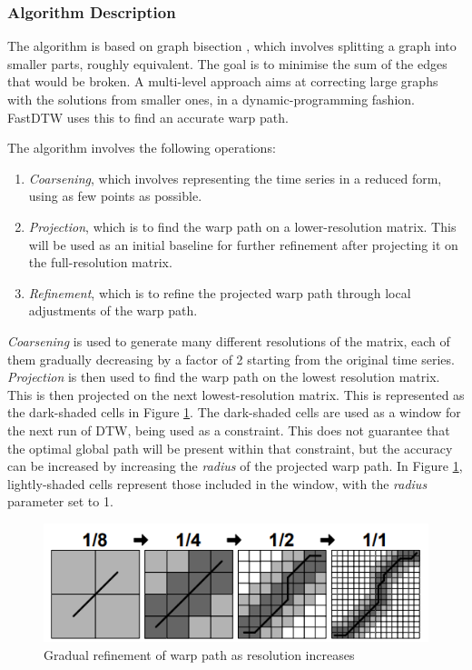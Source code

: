 \documentclass[final,rdr32.tex]{subfiles}
\begin{document}
\subsubsection{Algorithm Description}

The algorithm is based on graph bisection \cite{karypis1997multilevel}, which involves splitting a graph into smaller parts, roughly equivalent. The goal is to minimise the sum of the edges that would be broken. A multi-level approach aims at correcting large graphs with the solutions from smaller ones, in a dynamic-programming fashion. FastDTW uses this to find an accurate warp path.

The algorithm involves the following operations:
\begin{enumerate}
    \item \textit{Coarsening}, which involves representing the time series in a reduced form, using as few points as possible.
    \item \textit{Projection}, which is to find the warp path on a lower-resolution matrix. This will be used as an initial baseline for further refinement after projecting it on the full-resolution matrix.
    \item \textit{Refinement}, which is to refine the projected warp path through local adjustments of the warp path.
\end{enumerate}

\textit{Coarsening} is used to generate many different resolutions of the matrix, each of them gradually decreasing by a factor of 2 starting from the original time series. \textit{Projection} is then used to find the warp path on the lowest resolution matrix. This is then projected on the next lowest-resolution matrix. This is represented as the dark-shaded cells in Figure \ref{fig:fastdtw}. The dark-shaded cells are used as a window for the next run of DTW, being used as a constraint. This does not guarantee that the optimal global path will be present within that constraint, but the accuracy can be increased by increasing the \textit{radius} of the projected warp path. In Figure \ref{fig:fastdtw}, lightly-shaded cells represent those included in the window, with the \textit{radius} parameter set to 1.

\begin{figure}[H]
    \begin{center}
        \includegraphics[scale=0.9]{images/fastdtw.png}
        \caption{Gradual refinement of warp path as resolution increases}
        \label{fig:fastdtw}
    \end{center}
\end{figure}
\end{document}
